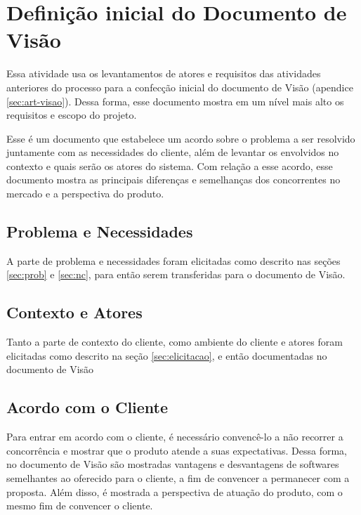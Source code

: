 \section{Definição inicial do Documento de Visão}
\label{sec:visao}

Essa atividade usa os levantamentos de atores e requisitos das atividades anteriores do processo para a confecção inicial do documento de Visão (apendice \ref{sec:art-visao}). Dessa forma, esse documento mostra em um nível mais alto os requisitos e escopo do projeto.

Esse é um documento que estabelece um acordo sobre o problema a ser resolvido juntamente com as necessidades do cliente, além de levantar os envolvidos no contexto e quais serão os atores do sistema. Com relação a esse acordo, esse documento mostra as principais diferenças e semelhanças dos concorrentes no mercado e a perspectiva do produto.

\subsection{Problema e Necessidades}
A parte de problema e necessidades foram elicitadas como descrito nas seções \ref{sec:prob} e \ref{sec:nc}, para então serem transferidas para o documento de Visão.

\subsection{Contexto e Atores}
Tanto a parte de contexto do cliente, como ambiente do cliente e atores foram elicitadas como descrito na seção \ref{sec:elicitacao}, e então documentadas no documento de Visão

\subsection{Acordo com o Cliente}
Para entrar em acordo com o cliente, é necessário convencê-lo a não recorrer a concorrência e mostrar que o produto atende a suas expectativas. Dessa forma, no documento de Visão são mostradas vantagens e desvantagens de softwares semelhantes ao oferecido para o cliente, a fim de convencer a permanecer com a proposta. Além disso, é mostrada a perspectiva de atuação do produto, com o mesmo fim de convencer o cliente.
